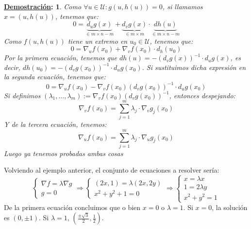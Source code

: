 \documentclass[10pt,a4paper,openright]{book}
\theoremstyle{break}
\newtheorem*{demo}{\underline{Demostración}:}
\begin{document}
\begin{demo}
Como $\forall u \in \mathcal{U}: g(u, h(u)) = 0$, si llamamos $x = (u, h(u))$, tenemos que:
\begin{equation}
0 = \underbrace{d_u g(x)}_{\in m \times n - m} + \underbrace{d_v g(x)}_{\in m \times m} \cdot \underbrace{dh(u)}_{\in m \times n - m}
\end{equation}
Como $f(u, h(u))$ tiene un extremo en $u_0 \in \mathcal{U}$, tenemos que:
\begin{equation}
0 = \nabla_u f(x_0) + \nabla_v f(x_0) \cdot d_h(u_0)
\end{equation}
Por la primera ecuación, tenemos que $dh(u) = - (d_v g(x))^{-1} \cdot d_u g(x)$, es decir, $dh(u_0) = - (d_v g(x_0))^{-1} \cdot d_u g(x_0)$. Si sustituimos dicha expresión en la segunda ecuación, tenemos que:
\begin{equation}
0 = \nabla_u f(x_0) - \nabla_v f(x_0) \left( d_v g(x_0) \right)^{-1} \cdot d_u g(x_0)
\end{equation}
Si definimos $(\lambda_1, \ldots, \lambda_m) := \nabla_v f(x_0) \left( d_v g(x_0) \right)^{-1}$, entonces despejando:
$$\nabla_v f(x_0) = \sum_{j = 1}^{m} \lambda_j \cdot \nabla_v g_j (x_0)$$
Y de la tercera ecuación, tenemos:
$$\nabla_u f(x_0) = \sum_{j = 1}^{m} \lambda_j \cdot \nabla_u g_j (x_0)$$
Luego ya tenemos probadas ambas cosas
\end{demo}


Volviendo al ejemplo anterior, el conjunto de ecuaciones a resolver sería:
$$\begin{cases} \nabla f = \lambda \nabla g \\ g = 0
\end{cases} \Rightarrow \begin{cases} (2x,1) = \lambda (2x, 2y) \\ x^2+y^2+1=0
\end{cases}\Rightarrow \begin{cases} x = \lambda x \\ 1 = 2\lambda y \\ x^2 + y^2 = 1\end{cases}$$
De la primera ecuación concluimos que o bien $x = 0$ o $\lambda = 1$. Si $x = 0$, la solución es $(0, \pm 1)$. Si $\lambda = 1$, $(\frac{\pm \sqrt{3}}{2}, \frac{1}{2})$. 
\end{document}
